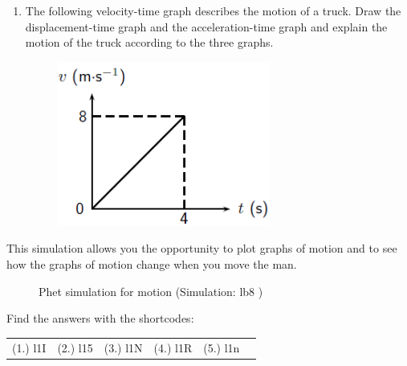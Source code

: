 \begin{enumerate}[noitemsep, label=\textbf{\arabic*}. ]
\begin{figure}[H]
\begin{center}
      \vspace{2pt}
    \vspace{.1in}
    \end{center}
 \end{figure}               \label{m38795*uid120}\item The following velocity-time graph describes the motion of a truck. Draw the displacement-time graph and the acceleration-time graph and explain the motion of the truck according to the three graphs.
    \setcounter{subfigure}{0}
	\begin{figure}[H] %
    \begin{center}
    \label{m38795*id73089!!!underscore!!!media}\label{m38795*id73089!!!underscore!!!printimage}\includegraphics[width=7cm]{col11305.imgs/m38795_PG10C2_028.png} %
      \vspace{2pt}
    \vspace{.1in}
    \end{center}
 \end{figure}               \end{enumerate}
\label{m38795*eip-842}This simulation allows you the opportunity to plot graphs of motion and to see how the graphs of motion change when you move the man.
    \setcounter{subfigure}{0}
	\begin{figure}[H] %
    \textnormal{Phet simulation for motion}\vspace{.1in} \nopagebreak
  \label{m38806*phet!!!underscore!!!sim}\label{m38806*phet-simulation}
             { (Simulation:  lb8 )}
      \vspace{2pt}
    \vspace{.1in}
 \end{figure}           \par 
  \label{m38795**end}
\par {} Find the answers with the shortcodes:
 \par \begin{tabular}[h]{cccccc}
 (1.) l1I  &  (2.) l15  &  (3.) l1N  &  (4.) l1R  &  (5.) l1n  & \end{tabular}
